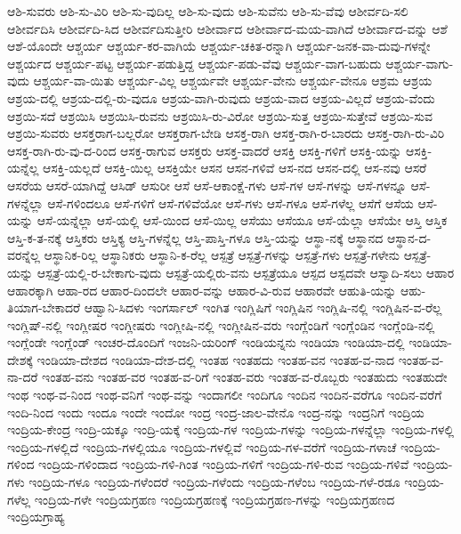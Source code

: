 {ಆಶಿ-ಸುವರು
ಆಶಿ-ಸು-ವಿರಿ
ಆಶಿ-ಸು-ವುದಿಲ್ಲ
ಆಶಿ-ಸು-ವುದು
ಆಶಿ-ಸುವೆನು
ಆಶಿ-ಸು-ವೆವು
ಆಶೀರ್ವದಿ-ಸಲಿ
ಆಶೀರ್ವದಿಸಿ
ಆಶೀರ್ವದಿ-ಸಿದ
ಆಶೀರ್ವದಿಸುತ್ತೀರಿ
ಆಶೀರ್ವಾದ
ಆಶೀರ್ವಾದ-ಮಯ-ವಾಗಿದೆ
ಆಶೀರ್ವಾದ-ವನ್ನು
ಆಶೆ
ಆಶೆ-ಯೊಂದೇ
ಆಶ್ಚರ್ಯ
ಆಶ್ಚರ್ಯ-ಕರ-ವಾಗಿಯೆ
ಆಶ್ಚರ್ಯ-ಚಕಿತ-ರನ್ನಾಗಿ
ಆಶ್ಚರ್ಯ-ಜನಕ-ವಾ-ದುವು-ಗಳನ್ನೇ
ಆಶ್ಚರ್ಯದ
ಆಶ್ಚರ್ಯ-ಪಟ್ಟ
ಆಶ್ಚರ್ಯ-ಪಡುತ್ತಿದ್ದ
ಆಶ್ಚರ್ಯ-ಪಡು-ವೆವು
ಆಶ್ಚರ್ಯ-ವಾಗ-ಬಹುದು
ಆಶ್ಚರ್ಯ-ವಾಗು-ವುದು
ಆಶ್ಚರ್ಯ-ವಾ-ಯಿತು
ಆಶ್ಚರ್ಯ-ವಿಲ್ಲ
ಆಶ್ಚರ್ಯವೇ
ಆಶ್ಚರ್ಯ-ವೇನು
ಆಶ್ಚರ್ಯ-ವೇನೂ
ಆಶ್ರಮ
ಆಶ್ರಯ
ಆಶ್ರಯ-ದಲ್ಲಿ
ಆಶ್ರಯ-ದಲ್ಲಿ-ರು-ವುದೂ
ಆಶ್ರಯ-ವಾಗಿ-ರುವುದು
ಆಶ್ರಯ-ವಾದ
ಆಶ್ರಯ-ವಿಲ್ಲದೆ
ಆಶ್ರಯ-ವೆಂದು
ಆಶ್ರಯಿ-ಸದೆ
ಆಶ್ರಯಿಸಿ
ಆಶ್ರಯಿಸಿ-ರುವನು
ಆಶ್ರಯಿಸಿ-ರು-ವಿರೋ
ಆಶ್ರಯಿ-ಸುತ್ತ
ಆಶ್ರಯಿ-ಸುತ್ತೇವೆ
ಆಶ್ರಯಿ-ಸುವ
ಆಶ್ರಯಿ-ಸುವರು
ಆಸಕ್ತರಾಗ-ಬಲ್ಲರೋ
ಆಸಕ್ತರಾಗ-ಬೇಡಿ
ಆಸಕ್ತ-ರಾಗಿ
ಆಸಕ್ತ-ರಾಗಿ-ರ-ಬಾರದು
ಆಸಕ್ತ-ರಾಗಿ-ರು-ವಿರಿ
ಆಸಕ್ತ-ರಾಗಿ-ರು-ವು-ದ-ರಿಂದ
ಆಸಕ್ತ-ರಾಗುವ
ಆಸಕ್ತರು
ಆಸಕ್ತ-ವಾದರೆ
ಆಸಕ್ತಿ
ಆಸಕ್ತಿ-ಗಳಿಗೆ
ಆಸಕ್ತಿ-ಯನ್ನು
ಆಸಕ್ತಿ-ಯನ್ನೆಲ್ಲ
ಆಸಕ್ತಿ-ಯಲ್ಲದೆ
ಆಸಕ್ತಿ-ಯಿಲ್ಲ
ಆಸಕ್ತಿಯೇ
ಆಸನ
ಆಸನ-ಗಳಿವೆ
ಆಸ-ನದ
ಆಸನ-ದಲ್ಲಿ
ಆಸ-ನವು
ಆಸರೆ
ಆಸರೆಯ
ಆಸರೆ-ಯಾಗಿದ್ದೆ
ಆಸಿಡ್
ಆಸುರೀ
ಆಸೆ
ಆಸೆ-ಆಕಾಂಕ್ಷೆ-ಗಳು
ಆಸೆ-ಗಳ
ಆಸೆ-ಗಳನ್ನು
ಆಸೆ-ಗಳನ್ನೂ
ಆಸೆ-ಗಳನ್ನೆಲ್ಲಾ
ಆಸೆ-ಗಳಿಂದಲೂ
ಆಸೆ-ಗಳಿಗೆ
ಆಸೆ-ಗಳಿವೆಯೋ
ಆಸೆ-ಗಳು
ಆಸೆ-ಗಳೂ
ಆಸೆ-ಗಳೆಲ್ಲ
ಆಸೆಗೆ
ಆಸೆಯ
ಆಸೆ-ಯನ್ನು
ಆಸೆ-ಯನ್ನೆಲ್ಲಾ
ಆಸೆ-ಯಲ್ಲಿ
ಆಸೆ-ಯಿಂದ
ಆಸೆ-ಯಿಲ್ಲ
ಆಸೆಯು
ಆಸೆಯೂ
ಆಸೆ-ಯೆಲ್ಲಾ
ಆಸೆಯೇ
ಆಸ್ತಿ
ಆಸ್ತಿಕ
ಆಸ್ತಿ-ಕ-ತ-ನಕ್ಕೆ
ಆಸ್ತಿಕರು
ಆಸ್ತಿಕ್ಯ
ಆಸ್ತಿ-ಗಳನ್ನೆಲ್ಲ
ಆಸ್ತಿ-ಪಾಸ್ತಿ-ಗಳೂ
ಆಸ್ತಿ-ಯನ್ನು
ಆಸ್ಥಾ-ನಕ್ಕೆ
ಆಸ್ಥಾನದ
ಆಸ್ಥಾನ-ದ-ವರನ್ನೆಲ್ಲ
ಆಸ್ಥಾನಿಕ-ರಿಲ್ಲ
ಆಸ್ಥಾನಿಕರು
ಆಸ್ಥಾನಿ-ಕ-ರೆಲ್ಲ
ಆಸ್ಪತ್ರೆ
ಆಸ್ಪತ್ರೆ-ಗಳನ್ನು
ಆಸ್ಪತ್ರೆ-ಗಳು
ಆಸ್ಪತ್ರೆ-ಗಳೇನು
ಆಸ್ಪತ್ರೆ-ಯನ್ನು
ಆಸ್ಪತ್ರೆ-ಯಲ್ಲಿ-ರ-ಬೇಕಾಗು-ವುದು
ಆಸ್ಪತ್ರೆ-ಯಲ್ಲಿರು-ವನು
ಆಸ್ಪತ್ರೆಯೂ
ಆಸ್ಪದ
ಆಸ್ಪದವೇ
ಆಸ್ವಾದಿ-ಸಲು
ಆಹಾರ
ಆಹಾರಕ್ಕಾಗಿ
ಆಹಾ-ರದ
ಆಹಾರ-ದಿಂದಲೇ
ಆಹಾರ-ವನ್ನು
ಆಹಾರ-ವಿ-ರುವ
ಆಹಾರವೇ
ಆಹುತಿ-ಯನ್ನು
ಆಹು-ತಿಯಾಗ-ಬೇಕಾದರೆ
ಆಹ್ವಾನಿ-ಸಿದಳು
ಇಂಗರ್ಸಾಲ್
ಇಂಗಿತ
ಇಂಗ್ಲಿಷಿಗೆ
ಇಂಗ್ಲಿಷಿನ
ಇಂಗ್ಲಿಷಿ-ನಲ್ಲಿ
ಇಂಗ್ಲಿಷಿನ-ವ-ರೆಲ್ಲ
ಇಂಗ್ಲಿಷ್-ನಲ್ಲಿ
ಇಂಗ್ಲೀಷರ
ಇಂಗ್ಲೀಷರು
ಇಂಗ್ಲೀಷಿ-ನಲ್ಲಿ
ಇಂಗ್ಲೀಷಿನ-ವರು
ಇಂಗ್ಲೆಂಡಿಗೆ
ಇಂಗ್ಲೆಂಡಿನ
ಇಂಗ್ಲೆಂಡಿ-ನಲ್ಲಿ
ಇಂಗ್ಲೆಂಡೇ
ಇಂಗ್ಲೆಂಡ್
ಇಂಚರ-ದೊಂದಿಗೆ
ಇಂಜನಿ-ಯರಿಂಗ್
ಇಂಡಿಯನ್ನನು
ಇಂಡಿಯಾ
ಇಂಡಿಯಾ-ದಲ್ಲಿ
ಇಂಡಿಯಾ-ದೇಶಕ್ಕೆ
ಇಂಡಿಯಾ-ದೇಶದ
ಇಂಡಿಯಾ-ದೇಶ-ದಲ್ಲಿ
ಇಂತಹ
ಇಂತಹದು
ಇಂತಹ-ವನ
ಇಂತಹ-ವ-ನಾದ
ಇಂತಹ-ವ-ನಾ-ದರೆ
ಇಂತಹ-ವನು
ಇಂತಹ-ವರ
ಇಂತಹ-ವ-ರಿಗೆ
ಇಂತಹ-ವರು
ಇಂತಹ-ವ-ರೊಬ್ಬರು
ಇಂತಹುದು
ಇಂತಹುದೇ
ಇಂಥ
ಇಂಥ-ವ-ನಿಂದ
ಇಂಥ-ವನಿಗೆ
ಇಂಥ-ವನ್ನು
ಇಂದಾಗಲೀ
ಇಂದಿಗೂ
ಇಂದಿನ
ಇಂದಿನ-ವರೆಗೂ
ಇಂದಿನ-ವರೆಗೆ
ಇಂದಿ-ನಿಂದ
ಇಂದು
ಇಂದೂ
ಇಂದೇ
ಇಂದೋ
ಇಂದ್ರ
ಇಂದ್ರ-ಜಾಲ-ವೇನೊ
ಇಂದ್ರ-ನನ್ನು
ಇಂದ್ರನಿಗೆ
ಇಂದ್ರಿಯ
ಇಂದ್ರಿಯ-ಕೇಂದ್ರ
ಇಂದ್ರಿ-ಯಕ್ಕೂ
ಇಂದ್ರಿ-ಯಕ್ಕೆ
ಇಂದ್ರಿಯ-ಗಳ
ಇಂದ್ರಿಯ-ಗಳನ್ನು
ಇಂದ್ರಿಯ-ಗಳನ್ನೆಲ್ಲಾ
ಇಂದ್ರಿಯ-ಗಳಲ್ಲಿ
ಇಂದ್ರಿಯ-ಗಳಲ್ಲಿದೆ
ಇಂದ್ರಿಯ-ಗಳಲ್ಲಿಯೂ
ಇಂದ್ರಿಯ-ಗಳಲ್ಲಿವೆ
ಇಂದ್ರಿಯ-ಗಳ-ವರೆಗೆ
ಇಂದ್ರಿಯ-ಗಳಾಚೆ
ಇಂದ್ರಿಯ-ಗಳಿಂದ
ಇಂದ್ರಿಯ-ಗಳಿಂದಾದ
ಇಂದ್ರಿಯ-ಗಳಿ-ಗಿಂತ
ಇಂದ್ರಿಯ-ಗಳಿಗೆ
ಇಂದ್ರಿಯ-ಗಳಿ-ರುವ
ಇಂದ್ರಿಯ-ಗಳಿವೆ
ಇಂದ್ರಿಯ-ಗಳು
ಇಂದ್ರಿಯ-ಗಳೂ
ಇಂದ್ರಿಯ-ಗಳೆಂದರೆ
ಇಂದ್ರಿಯ-ಗಳೆಂದು
ಇಂದ್ರಿಯ-ಗಳೆಂಬ
ಇಂದ್ರಿಯ-ಗಳೆ-ರಡೂ
ಇಂದ್ರಿಯ-ಗಳೆಲ್ಲ
ಇಂದ್ರಿಯ-ಗಳೇ
ಇಂದ್ರಿಯಗ್ರಹಣ
ಇಂದ್ರಿಯಗ್ರಹಣಕ್ಕೆ
ಇಂದ್ರಿಯಗ್ರಹಣ-ಗಳನ್ನು
ಇಂದ್ರಿಯಗ್ರಹಣದ
ಇಂದ್ರಿಯಗ್ರಾಹ್ಯ
}
